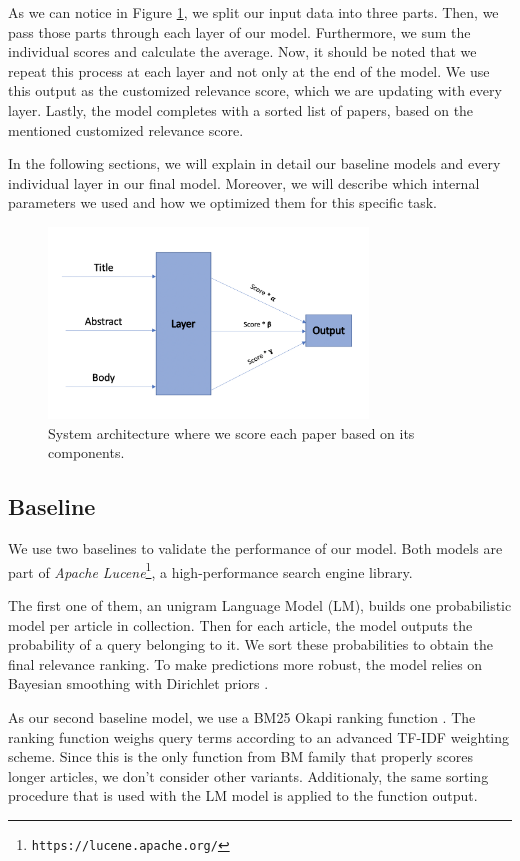 \documentclass[10pt, a4paper]{article}
\begin{document}
	As we can notice in Figure \ref{figure:approach}, we split our input data into three parts. Then, we pass those parts through each layer of our model. Furthermore, we sum the individual scores and calculate the average. Now, it should be noted that we repeat this process at each layer and not only at the end of the model. We use this output as the customized relevance score, which we are updating with every layer.  Lastly, the model completes with a sorted list of papers, based on the mentioned customized relevance score.
	
	In the following sections, we will explain in detail our baseline models and every individual layer in our final model. Moreover, we will describe which internal parameters we used and how we optimized them for this specific task.
	
	\begin{figure}[h]
		\centering
		\includegraphics[width=8.5cm]{approach}
		\caption{System architecture where we score each paper based on its components.  }
		\label{figure:approach}
	\end{figure}
	
	
	\subsection{Baseline}
	
	We use two baselines to validate the performance of our model. Both models are part of \emph{Apache Lucene}\footnote{\texttt{https://lucene.apache.org/}}, a high-performance search engine library.
	
	The first one of them, an unigram Language Model (LM), builds one probabilistic model per article in collection. Then for each article, the model outputs the probability of a query belonging to it. We sort these probabilities to obtain the final relevance ranking. To make predictions more robust, the model relies on Bayesian smoothing with Dirichlet priors \citep{zhai2004study}.
	
	As our second baseline model, we use a BM25 Okapi ranking function \citep{robertson1995okapi}. The ranking function weighs query terms according to an advanced TF-IDF weighting scheme. Since this is the only function from BM family that properly scores longer articles, we don't consider other variants. Additionaly, the same sorting procedure that is used with the LM model is applied to the function output.
	
\end{document}
